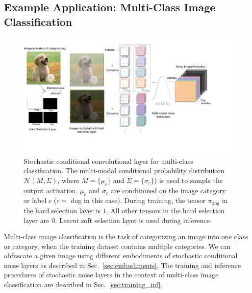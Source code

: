 \documentclass[12pt, letterpaper]{article}
\begin{document}
\subsection{Example Application: Multi-Class Image Classification}
\label{sec:classification}
\begin{figure}[h!]
    \centering
    \includegraphics[width=\textwidth, trim={0cm 2cm 2.4cm 0.5cm}, clip]{Classification Conditional noise layer.pdf}
    \caption{Stochastic conditional convolutional layer for multi-class classification. The multi-modal conditional probability distribution $\mathcal{N}(M, \Sigma)$, where $M=\{\mu_c\}$ and $\Sigma=\{\sigma_c\}$) is used to sample the output activation. $\mu_c$ and $\sigma_c$ are conditioned on the image category or label $c$ ($c=$ dog in this case). During training, the tensor $\pi_\mathrm{dog}$ in the hard selection layer is $1$. All other tensors in the hard selection layer are $0$. Learnt soft selection layer is used during inference.}
    \label{fig:classification}
\end{figure}
Multi-class image classification is the task of categorizing an image into one class or category, when the training dataset contains multiple categories. We can obfuscate a given image using different embodiments of stochastic conditional noise layers as described in Sec.~\ref{sec:embodiments}. 
The training and inference procedures of stochastic noise layers in the context of multi-class image classification are described in Sec.~\ref{sec:training_inf}.
\end{document}
